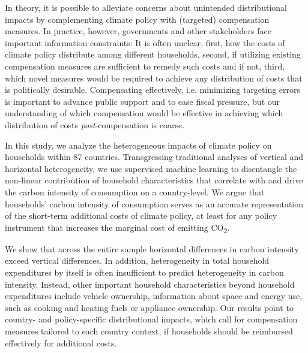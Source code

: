 \documentclass[12pt, a4paper]{article}
\begin{document}
In theory, it is possible to alleviate concerns about unintended distributional impacts by complementing climate policy with (targeted) compensation measures. In practice, however, governments and other stakeholders face important information constraints: It is often unclear, first, how the costs of climate policy distribute among different households, second, if utilizing existing compensation measures are sufficient to remedy such costs and if not, third, which novel measures would be required to achieve any distribution of costs that is politically desirable. Compensating effectively, i.e. minimizing targeting errors is important to advance public support and to ease fiscal pressure, but our understanding of which compensation would be effective in achieving which distribution of costs \textit{post}-compensation is coarse.

In this study, we analyze the heterogeneous impacts of climate policy on households within 87 countries. Transgressing traditional analyses of vertical and horizontal heterogeneity, we use supervised machine learning to disentangle the non-linear contribution of household characteristics that correlate with and drive the carbon intensity of consumption on a country-level. We argue that households' carbon intensity of consumption serves as an accurate representation of the short-term additional costs of climate policy, at least for any policy instrument that increases the marginal cost of emitting CO\textsubscript{2}.

We show that across the entire sample horizontal differences in carbon intensity exceed vertical differences. In addition, heterogeneity in total household expenditures by itself is often insufficient to predict heterogeneity in carbon intensity. Instead, other important household characteristics beyond household expenditures include vehicle ownership, information about space and energy use, such as cooking and heating fuels or appliance ownership. Our results point to country- and policy-specific distributional impacts, which call for compensation measures tailored to each country context, if households should be reimbursed effectively for additional costs. 
\end{document}
